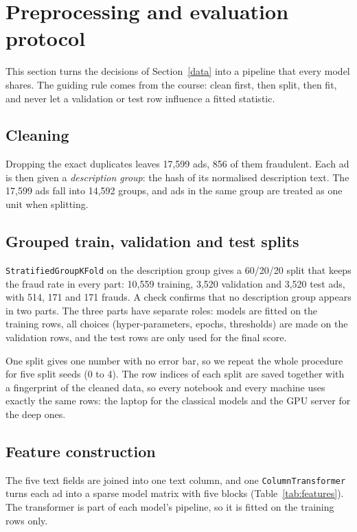 \section{Preprocessing and evaluation protocol}
\label{protocol}

This section turns the decisions of Section~\ref{data} into a pipeline that every model shares.
The guiding rule comes from the course: clean first, then split, then fit, and never let a
validation or test row influence a fitted statistic.

\subsection{Cleaning}

Dropping the exact duplicates leaves 17,599 ads, 856 of them fraudulent. Each ad is then given a
\emph{description group}: the hash of its normalised description text. The 17,599 ads fall into
14,592 groups, and ads in the same group are treated as one unit when splitting.

\subsection{Grouped train, validation and test splits}

\texttt{StratifiedGroupKFold} on the description group gives a 60/20/20 split that keeps the fraud
rate in every part: 10,559 training, 3,520 validation and 3,520 test ads, with 514, 171 and 171
frauds. A check confirms that no description group appears in two parts. The three parts have
separate roles: models are fitted on the training rows, all choices (hyper-parameters, epochs,
thresholds) are made on the validation rows, and the test rows are only used for the final score.

One split gives one number with no error bar, so we repeat the whole procedure for five split
seeds (0 to 4). The row indices of each split are saved together with a fingerprint of the cleaned
data, so every notebook and every machine uses exactly the same rows: the laptop for the classical
models and the GPU server for the deep ones.

\subsection{Feature construction}

The five text fields are joined into one text column, and one \texttt{ColumnTransformer} turns
each ad into a sparse model matrix with five blocks (Table~\ref{tab:features}). The transformer is
part of each model's pipeline, so it is fitted on the training rows only.

